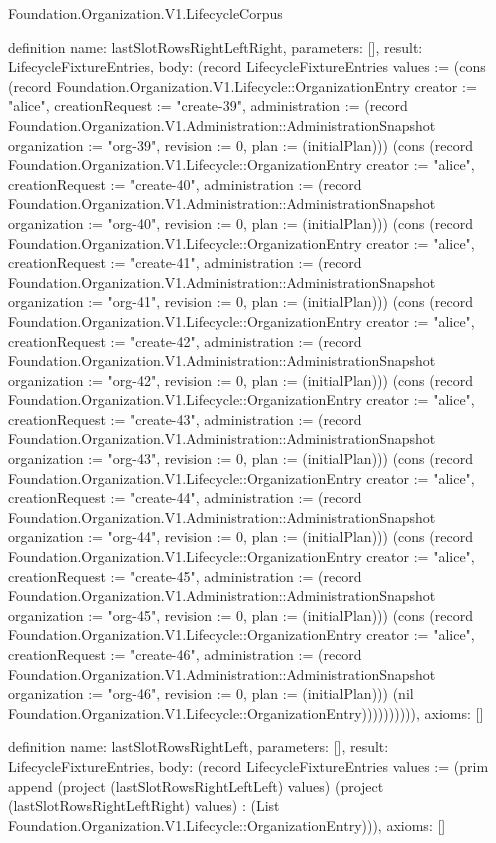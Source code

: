 \begin{lexlean}{Foundation.Organization.V1.LifecycleCorpus}
\begin{semanticmodule}
definition{
  name: lastSlotRowsRightLeftRight,
  parameters: [],
  result: LifecycleFixtureEntries,
  body: (record LifecycleFixtureEntries {values := (cons (record Foundation.Organization.V1.Lifecycle::OrganizationEntry {creator := "alice", creationRequest := "create-39", administration := (record Foundation.Organization.V1.Administration::AdministrationSnapshot {organization := "org-39", revision := 0, plan := (initialPlan)})}) (cons (record Foundation.Organization.V1.Lifecycle::OrganizationEntry {creator := "alice", creationRequest := "create-40", administration := (record Foundation.Organization.V1.Administration::AdministrationSnapshot {organization := "org-40", revision := 0, plan := (initialPlan)})}) (cons (record Foundation.Organization.V1.Lifecycle::OrganizationEntry {creator := "alice", creationRequest := "create-41", administration := (record Foundation.Organization.V1.Administration::AdministrationSnapshot {organization := "org-41", revision := 0, plan := (initialPlan)})}) (cons (record Foundation.Organization.V1.Lifecycle::OrganizationEntry {creator := "alice", creationRequest := "create-42", administration := (record Foundation.Organization.V1.Administration::AdministrationSnapshot {organization := "org-42", revision := 0, plan := (initialPlan)})}) (cons (record Foundation.Organization.V1.Lifecycle::OrganizationEntry {creator := "alice", creationRequest := "create-43", administration := (record Foundation.Organization.V1.Administration::AdministrationSnapshot {organization := "org-43", revision := 0, plan := (initialPlan)})}) (cons (record Foundation.Organization.V1.Lifecycle::OrganizationEntry {creator := "alice", creationRequest := "create-44", administration := (record Foundation.Organization.V1.Administration::AdministrationSnapshot {organization := "org-44", revision := 0, plan := (initialPlan)})}) (cons (record Foundation.Organization.V1.Lifecycle::OrganizationEntry {creator := "alice", creationRequest := "create-45", administration := (record Foundation.Organization.V1.Administration::AdministrationSnapshot {organization := "org-45", revision := 0, plan := (initialPlan)})}) (cons (record Foundation.Organization.V1.Lifecycle::OrganizationEntry {creator := "alice", creationRequest := "create-46", administration := (record Foundation.Organization.V1.Administration::AdministrationSnapshot {organization := "org-46", revision := 0, plan := (initialPlan)})}) (nil Foundation.Organization.V1.Lifecycle::OrganizationEntry)))))))))}),
  axioms: []
}

definition{
  name: lastSlotRowsRightLeft,
  parameters: [],
  result: LifecycleFixtureEntries,
  body: (record LifecycleFixtureEntries {values := (prim append (project (lastSlotRowsRightLeftLeft) values) (project (lastSlotRowsRightLeftRight) values) : (List Foundation.Organization.V1.Lifecycle::OrganizationEntry))}),
  axioms: []
}


\end{semanticmodule}
\end{lexlean}

